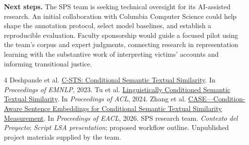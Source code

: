 \documentclass{article}
\begin{document}
\textbf{Next steps.} The SPS team is seeking technical oversight for its AI-assisted research. An initial collaboration with Columbia Computer Science could help shape the annotation protocol, select model baselines, and establish a reproducible evaluation. Faculty sponsorship would guide a focused pilot using the team's corpus and expert judgments, connecting research in representation learning with the substantive work of interpreting victims' accounts and informing transitional justice.

\begin{thebibliography}{4}
\small
{} Deshpande et al. \href{https://aclanthology.org/2023.emnlp-main.345/}{C-STS: Conditional Semantic Textual Similarity}. In \emph{Proceedings of EMNLP}, 2023.
 Tu et al. \href{https://aclanthology.org/2024.acl-long.64/}{Linguistically Conditioned Semantic Textual Similarity}. In \emph{Proceedings of ACL}, 2024.
 Zhang et al. \href{https://aclanthology.org/2026.eacl-long.231/}{CASE---Condition-Aware Sentence Embeddings for Conditional Semantic Textual Similarity Measurement}. In \emph{Proceedings of EACL}, 2026.
 SPS research team. \emph{Contexto del Proyecto}; \emph{Script LSA presentation}; proposed workflow outline. Unpublished project materials supplied by the team.
\end{thebibliography}
\end{document}

